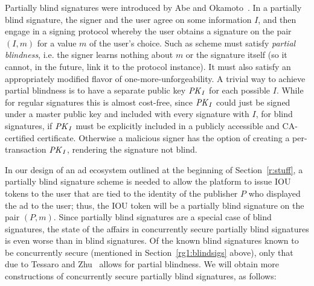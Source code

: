 Partially blind signatures were introduced by Abe and Okamoto~\cite{C:AbeOka00}.  In a partially blind signature, the signer and the user agree on some information $I$, and then engage in a signing protocol whereby the user obtains a signature on the pair $(I,m)$ for a value $m$ of the user's choice.  Such as scheme must satisfy \textit{partial blindness}, i.e. the signer learns nothing about $m$ or the signature itself (so it cannot, in the future, link it to the protocol instance).  It must also satisfy an appropriately modified flavor of one-more-unforgeability.
A trivial way to achieve partial blindness is to have a separate public key $\mathit{PK}_I$ for each possible $I$.  While for regular signatures this is almost cost-free, since $\mathit{PK}_I$ could just be signed under a master public key and included with every signature with $I$, for blind signatures, if $\mathit{PK}_I$ must be explicitly included in a publicly accessible and CA-certified certificate. Otherwise a malicious signer has the option of creating a per-transaction $\mathit{PK}_I$, rendering the signature not blind.

In our design of an ad ecosystem outlined at the beginning of Section~\ref{r:stuff}, a partially blind signature scheme is needed to allow the platform to issue IOU tokens to the user that are tied to the identity of the publisher $P$ who displayed the ad to the user; thus, the IOU token will be a partially blind signature on the pair $(P,m)$.  Since partially blind signatures are a special case of blind signatures, the state of the affairs in concurrently secure partially blind signatures is even worse than in blind signatures.  Of the known blind signatures known to be concurrently secure (mentioned in Section~\ref{rg1:blindsigs} above), only that due to Tessaro and Zhu~\cite{EC:TesZhu22} allows for partial blindness.  We will obtain more constructions of concurrently secure partially blind signatures, as follows:

